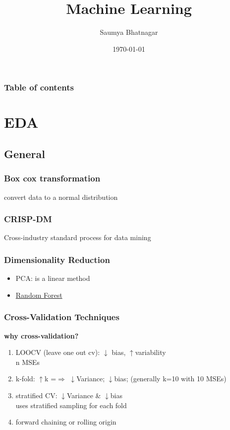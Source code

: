 \documentclass{beamer}
\begin{document}
	\title{Machine Learning}  
	\author{Saumya Bhatnagar}
	\date{\today} 
	
	
\begin{frame}
\titlepage
\end{frame}

\begin{frame}[allowframebreaks]\frametitle{Table of contents}\tableofcontents
\end{frame} 




\section{EDA}

\subsection{General}
\begin{frame}\frametitle{Box cox transformation}
	convert data to a normal distribution
\end{frame}

\begin{frame}\frametitle{CRISP-DM}
Cross-industry standard process for data mining
\end{frame}

\begin{frame}\frametitle{Dimensionality Reduction}
\begin{itemize}
	\item PCA: is a linear method
	\item \hyperlink{rf}{Random Forest}
\end{itemize}
\end{frame}

\begin{frame}\frametitle{Cross-Validation Techniques}
	\textbf{why cross-validation?}\\
	\begin{enumerate}
		\item LOOCV (leave one out cv): $\downarrow$ bias, $\uparrow$variability\\n MSEs
		\item k-fold: $\uparrow$k =$\Rightarrow$ $\downarrow$Variance; $\downarrow$bias; (generally k=10 with 10 MSEs)
		\item stratified CV: $\downarrow$Variance \& $\downarrow$bias\\
		uses stratified sampling for each fold
		\item forward chaining or rolling origin
	\end{enumerate}
\end{frame}
\end{document}
